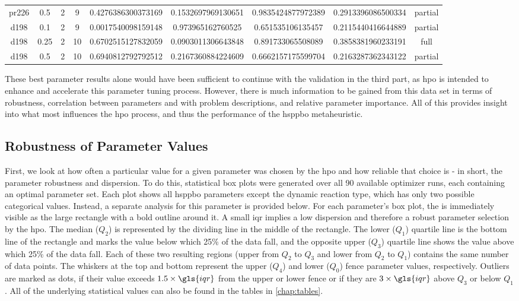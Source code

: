 \begin{table}[h]
\begin{tabular}{cc | ccccccc}
		pr226 & 0.5 & 2 & 9 & \num{0.4276386300373169} & \num{0.1532697969130651} & \num{0.9835424877972389} & \num{0.2913396086500334} & partial \\ 
		d198 & 0.1 & 2 & 9 & \num{0.0017540098159148} & \num{0.973965162760525} & \num{0.651535106135457} & \num{0.2115440416644889} & partial \\ 
		d198 & 0.25 & 2 & 10 & \num{0.6702515127832059} & \num{0.0903011306643848} & \num{0.891733065508089} & \num{0.3858381960233191} & full \\ 
		d198 & 0.5 & 2 & 10 & \num{0.6940812792792512} & \num{0.2167360884224609} & \num{0.6662157175599704} & \num{0.2163287362343122} & partial \\ \hline
	\end{tabular}
\end{table}

These best parameter results alone would have been sufficient to continue with the validation in the third part, as \gls{hpo} is intended to enhance and accelerate this parameter tuning process. However, there is much information to be gained from this data set in terms of robustness, correlation between parameters and with problem descriptions, and relative parameter importance. All of this provides insight into what most influences the \gls{hpo} process, and thus the performance of the \gls{hsppbo} metaheuristic.

\subsection{Robustness of Parameter Values}

First, we look at how often a particular value for a given parameter was chosen by the \gls{hpo} and how reliable that choice is  - in short, the parameter robustness and dispersion. To do this, statistical box plots were generated over all 90 available optimizer runs, each containing an optimal parameter set. Each plot shows all \gls{hsppbo} parameters except the dynamic reaction type, which has only two possible categorical values. Instead, a separate analysis for this parameter is provided below. For each parameter's box plot, the  is immediately visible as the large rectangle with a bold outline around it. A small \gls{iqr} implies a low dispersion and therefore a robust parameter selection by the \gls{hpo}. 
The median ($Q_2$) is represented by the dividing line in the middle of the rectangle. The lower ($Q_1$) quartile line is the bottom line of the rectangle and marks the value below which 25\% of the data fall, and the opposite upper ($Q_3$) quartile line shows the value above which 25\% of the data fall. Each of these two resulting regions (upper from $Q_2$ to $Q_3$ and lower from $Q_2$ to $Q_1$) contains the same number of data points. The whiskers at the top and bottom represent the upper ($Q_4$) and lower ($Q_0$) fence parameter values, respectively. Outliers are marked as dots, if their value exceeds $1.5 \times \gls{iqr}$ from the upper or lower fence or if they are $3 \times \gls{iqr}$ above $Q_3$ or below $Q_1$. All of the underlying statistical values can also be found in the tables in \cref{chap:tables}.

